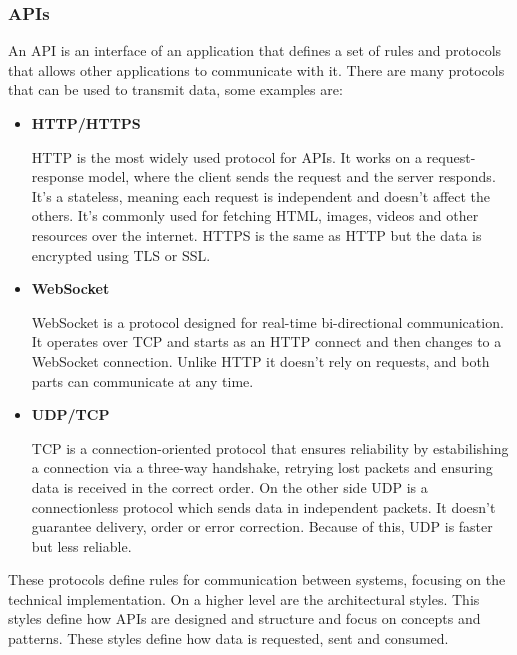 \subsubsection{APIs}
An API is an interface of an application that defines a set of rules and
protocols that allows other applications to communicate with it. There are many
protocols that can be used to transmit data, some examples are:

\begin{itemize}

	\item \textbf{HTTP/HTTPS}

	      HTTP is the most widely used protocol for APIs. It works on a
	      request-response model, where the client sends the request and the server
	      responds. It's a stateless, meaning each request is independent and doesn't
	      affect the others. It's commonly used for fetching HTML, images, videos
	      and other resources over the internet. HTTPS is the same as HTTP but the
	      data is encrypted using TLS or SSL.


	\item \textbf{WebSocket}

	      WebSocket is a protocol designed for real-time bi-directional communication.
	      It operates over TCP and starts as an HTTP connect and then changes to a
	      WebSocket connection. Unlike HTTP it doesn't rely on requests, and both
	      parts can communicate at any time.


	\item \textbf{UDP/TCP}

	      TCP is a connection-oriented protocol that ensures reliability by
	      estabilishing a connection via a three-way handshake, retrying lost
	      packets and ensuring data is received in the correct order.
	      On the other side UDP is a connectionless protocol which sends data in
	      independent packets. It doesn't guarantee delivery, order or error
	      correction. Because of this, UDP is faster but less reliable.


\end{itemize}

These protocols define rules for communication between systems, focusing on the
technical implementation. On a higher level are the architectural styles.
This styles define how APIs are designed and structure and focus on
concepts and patterns. These styles define how data is requested, sent and
consumed.

